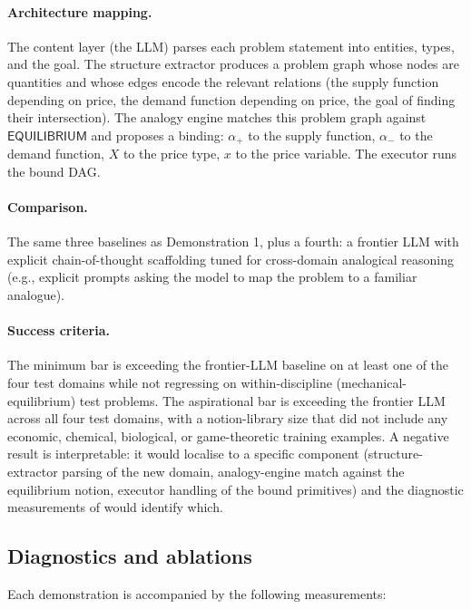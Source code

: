 \documentclass[11pt,a4paper]{article}
\theoremstyle{plain}
\theoremstyle{definition}
\theoremstyle{remark}
\begin{document}
\paragraph{Architecture mapping.}
The content layer (the LLM) parses each problem statement into entities, types, and the goal. The structure extractor produces a problem graph whose nodes are quantities and whose edges encode the relevant relations (the supply function depending on price, the demand function depending on price, the goal of finding their intersection). The analogy engine matches this problem graph against $\mathsf{EQUILIBRIUM}$ and proposes a binding: $\alpha_+$ to the supply function, $\alpha_-$ to the demand function, $X$ to the price type, $x$ to the price variable. The executor runs the bound DAG.

\paragraph{Comparison.}
The same three baselines as Demonstration 1, plus a fourth: a frontier LLM with explicit chain-of-thought scaffolding tuned for cross-domain analogical reasoning (e.g., explicit prompts asking the model to map the problem to a familiar analogue).

\paragraph{Success criteria.}
The minimum bar is exceeding the frontier-LLM baseline on at least one of the four test domains while not regressing on within-discipline (mechanical-equilibrium) test problems. The aspirational bar is exceeding the frontier LLM across all four test domains, with a notion-library size that did not include any economic, chemical, biological, or game-theoretic training examples. A negative result is interpretable: it would localise to a specific component (structure-extractor parsing of the new domain, analogy-engine match against the equilibrium notion, executor handling of the bound primitives) and the diagnostic measurements of  would identify which.

\subsection{Diagnostics and ablations}
\label{sec:emp-diagnostics}

Each demonstration is accompanied by the following measurements:
\end{document}
